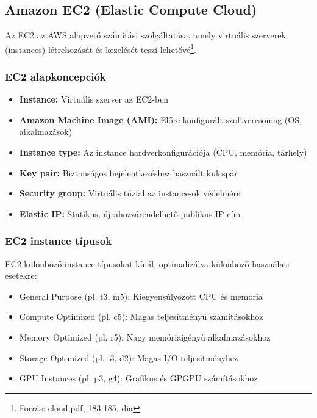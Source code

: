 \documentclass[a4paper,12pt]{article}
\begin{document}
    \subsection{Amazon EC2 (Elastic Compute Cloud)}

    Az EC2 az AWS alapvető számítási szolgáltatása, amely virtuális szerverek (instances) létrehozását és kezelését teszi lehetővé\footnote{Forrás: cloud.pdf, 183-185. dia}.

    \subsubsection{EC2 alapkoncepciók}

    \begin{itemize}
        \item \textbf{Instance:} Virtuális szerver az EC2-ben
        \item \textbf{Amazon Machine Image (AMI):} Előre konfigurált szoftvercsomag (OS, alkalmazások)
        \item \textbf{Instance type:} Az instance hardverkonfigurációja (CPU, memória, tárhely)
        \item \textbf{Key pair:} Biztonságos bejelentkezéshez használt kulcspár
        \item \textbf{Security group:} Virtuális tűzfal az instance-ok védelmére
        \item \textbf{Elastic IP:} Statikus, újrahozzárendelhető publikus IP-cím
    \end{itemize}

    \subsubsection{EC2 instance típusok}

    EC2 különböző instance típusokat kínál, optimalizálva különböző használati esetekre:

    \begin{itemize}
        \item General Purpose (pl. t3, m5): Kiegyensúlyozott CPU és memória
        \item Compute Optimized (pl. c5): Magas teljesítményű számításokhoz
        \item Memory Optimized (pl. r5): Nagy memóriaigényű alkalmazásokhoz
        \item Storage Optimized (pl. i3, d2): Magas I/O teljesítményhez
        \item GPU Instances (pl. p3, g4): Grafikus és GPGPU számításokhoz
    \end{itemize}
\end{document}
